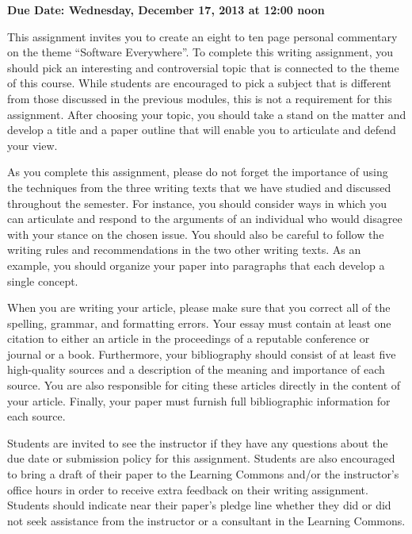 

\usepackage[compact]{titlesec}



\vspace*{-.2in}
\begin{center}
	{\bf Due Date: Wednesday, December 17, 2013 at 12:00 noon}
\end{center}

This assignment invites you to create an eight to ten page personal commentary on the theme ``Software Everywhere''.  To
complete this writing assignment, you should pick an interesting and controversial topic that is connected to the theme
of this course.  While students are encouraged to pick a subject that is different from those discussed in the previous
modules, this is not a requirement for this assignment. After choosing your topic, you should take a stand on the matter
and develop a title and a paper outline that will enable you to articulate and defend your view.

As you complete this assignment, please do not forget the importance of using the techniques from the three writing
texts that we have studied and discussed throughout the semester. For instance, you should consider ways in which you
can articulate and respond to the arguments of an individual who would disagree with your stance on the chosen issue.
You should also be careful to follow the writing rules and recommendations in the two other writing texts.  As an
example, you should organize your paper into paragraphs that each develop a single concept. 

When you are writing your article, please make sure that you correct all of the spelling, grammar, and formatting
errors. Your essay must contain at least one citation to either an article in the proceedings of a reputable conference
or journal or a book. Furthermore, your bibliography should consist of at least five high-quality sources and a
description of the meaning and importance of each source. You are also responsible for citing these articles directly in
the content of your article. Finally, your paper must furnish full bibliographic information for each source.

Students are invited to see the instructor if they have any questions about the due date or submission policy for
this assignment. Students are also encouraged to bring a draft of their paper to the Learning Commons and/or
the instructor's office hours in order to receive extra feedback on their writing assignment. Students should indicate
near their paper's pledge line whether they did or did not seek assistance from the instructor or a consultant in
the Learning Commons.


